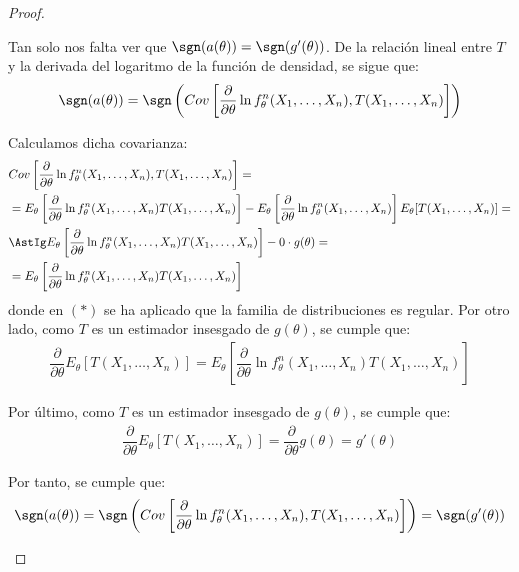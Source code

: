 \begin{teo}
\begin{proof}
\begin{description}
            Tan solo nos falta ver que $\sgn(a(\theta)) = \sgn(g'(\theta))$. De la relación lineal entre $T$ y la derivada del logaritmo de la función de densidad, se sigue que:
            \begin{equation*}
                \sgn(a(\theta)) = \sgn\left(Cov\left[\dfrac{\partial}{\partial\theta}\ln f^n_\theta(X_1,\ldots,X_n), T(X_1,\ldots,X_n)\right]\right)
            \end{equation*}

            Calculamos dicha covarianza:
            \begin{align*}
                &Cov\left[\dfrac{\partial}{\partial\theta}\ln f^n_\theta(X_1,\ldots,X_n), T(X_1,\ldots,X_n)\right]
                =\\&= E_\theta\left[\dfrac{\partial}{\partial\theta}\ln f^n_\theta(X_1,\ldots,X_n) T(X_1,\ldots,X_n)\right] - E_\theta\left[\dfrac{\partial}{\partial\theta}\ln f^n_\theta(X_1,\ldots,X_n)\right] E_\theta[T(X_1,\ldots,X_n)] =\\&\AstIg E_\theta\left[\dfrac{\partial}{\partial\theta}\ln f^n_\theta(X_1,\ldots,X_n) T(X_1,\ldots,X_n)\right] - 0 \cdot g(\theta) =\\&= E_\theta\left[\dfrac{\partial}{\partial\theta}\ln f^n_\theta(X_1,\ldots,X_n) T(X_1,\ldots,X_n)\right]
            \end{align*}
            donde en $(\ast)$ se ha aplicado que la familia de distribuciones es regular. Por otro lado, como $T$ es un estimador insesgado de $g(\theta)$, se cumple que:
            \begin{align*}
                \dfrac{\partial}{\partial\theta} E_\theta[T(X_1, \ldots, X_n)] = E_\theta\left[\dfrac{\partial}{\partial\theta} \ln f^n_\theta(X_1, \ldots, X_n) T(X_1, \ldots, X_n)\right]
            \end{align*}

            Por último, como $T$ es un estimador insesgado de $g(\theta)$, se cumple que:
            \begin{align*}
                \dfrac{\partial}{\partial\theta} E_\theta[T(X_1, \ldots, X_n)] = \dfrac{\partial}{\partial\theta} g(\theta) = g'(\theta)
            \end{align*}

            Por tanto, se cumple que:
            \begin{equation*}
                \sgn(a(\theta)) = \sgn\left(Cov\left[\dfrac{\partial}{\partial\theta}\ln f^n_\theta(X_1,\ldots,X_n), T(X_1,\ldots,X_n)\right]\right) = \sgn(g'(\theta))
            \end{equation*}


\end{description}
\end{proof}
\end{teo}
